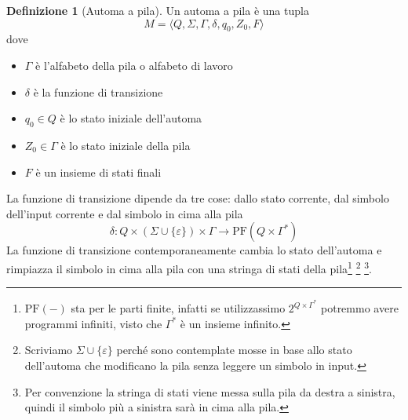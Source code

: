 \documentclass[12pt]{report}
\theoremstyle{definition}
\newtheorem{definizione}{Definizione}
\begin{document}
\begin{definizione}[Automa a pila]
	\label{def:Automa a pila}
	Un automa a pila è una tupla
	$$ M = \langle Q, \Sigma, \Gamma, \delta, q_0, Z_0, F \rangle $$
	dove
	\begin{itemize}
		\item $\Gamma$ è l'alfabeto della pila o alfabeto di lavoro
		\item $\delta$ è la funzione di transizione
		\item $q_0 \in Q$ è lo stato iniziale dell'automa
		\item $Z_0 \in \Gamma$ è lo stato iniziale della pila
		\item $F$ è un insieme di stati finali
	\end{itemize}
	La funzione di transizione dipende da tre cose: dallo stato corrente, dal simbolo dell'input corrente e dal simbolo in cima alla pila
	$$ \delta : Q \times (\Sigma \cup \{\varepsilon\}) \times \Gamma \rightarrow \text{PF}(Q \times \Gamma^*) $$
	La funzione di transizione contemporaneamente cambia lo stato dell'automa e rimpiazza il simbolo in cima alla pila con una stringa di stati della pila\footnote{$\text{PF}(-)$ sta per le parti finite, infatti se utilizzassimo $2^{Q \times \Gamma^*}$ potremmo avere programmi infiniti, visto che $\Gamma^*$ è un insieme infinito.} \footnote{Scriviamo $\Sigma \cup \{ \varepsilon \}$ perché sono contemplate mosse in base allo stato dell'automa che modificano la pila senza leggere un simbolo in input.} \footnote{Per convenzione la stringa di stati viene messa sulla pila da destra a sinistra, quindi il simbolo più a sinistra sarà in cima alla pila.}.
\end{definizione}
\end{document}
